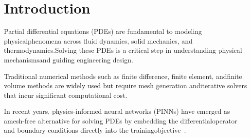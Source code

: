 \section{Introduction}

Partial differential equations (PDEs)
are fundamental to modeling physicalphenomena across fluid dynamics,
solid mechanics, and thermodynamics.Solving these PDEs is a critical step in
understanding physical mechanismsand guiding engineering design.

Traditional numerical methods such as finite difference, finite element,
andfinite volume methods are widely used but require mesh generation
anditerative solvers that incur significant computational cost.

In recent years, physics-informed neural networks (PINNs)
have emerged as amesh-free alternative for solving PDEs by embedding the
differentialoperator and boundary conditions directly into the
trainingobjective~\cite{raissi2019pinn}.
